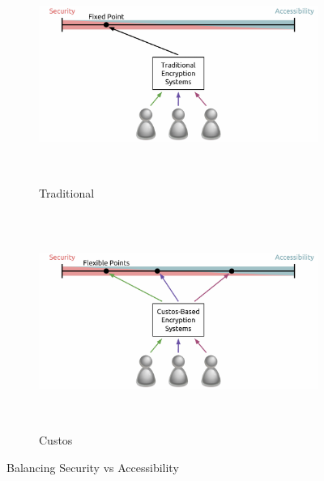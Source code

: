 \begin{figure}[!tb]
  \begin{center}
    \begin{subfigure}{\textwidth}
      \begin{center}
        \includegraphics[height=200pt]
                        {./figs/pdf/SecuityToAccessibility-Traditional.pdf}
        \caption{Traditional}
        \label{fig:SvA-traditional}
      \end{center}
    \end{subfigure}
    \begin{subfigure}{\textwidth}
      \begin{center}
        \includegraphics[height=200pt]
                        {./figs/pdf/SecuityToAccessibility-Custos.pdf}
        \caption{Custos}
        \label{fig:SvA-custos}
      \end{center}
    \end{subfigure}
  \end{center}
  \caption{Balancing Security vs Accessibility}
  \label{fig:SvA}
\end{figure}


